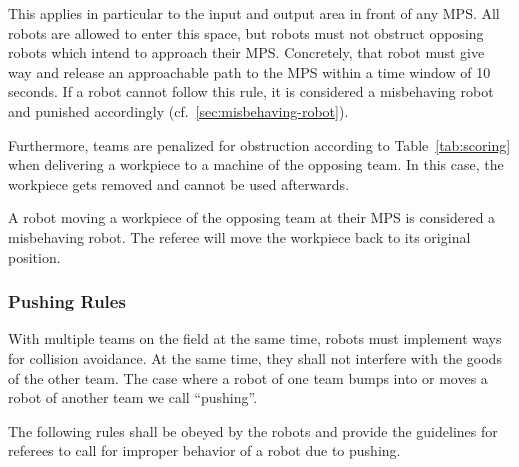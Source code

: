 \documentclass[12pt,twoside]{article}
\newcommand{\reftab}[1]{Table~\ref{#1}}
\begin{document}
This applies in particular to the input and output area in front of
any MPS\@.  All robots are allowed to enter this space, but robots must
not obstruct opposing robots which intend to approach their
MPS\@. Concretely, that robot must give way and release an approachable
path to the MPS within a time window of 10 seconds. If a robot cannot
follow this rule, it is considered a misbehaving robot and punished accordingly
(cf.~\ref{sec:misbehaving-robot}).

Furthermore, teams are penalized for obstruction according to
\reftab{tab:scoring} when delivering a workpiece to a machine of the
opposing team. In this case, the workpiece gets removed and cannot be
used afterwards.

A robot moving a workpiece of the opposing team at their MPS is considered a
misbehaving robot.
The referee will move the workpiece back to its original position.

\subsubsection{Pushing Rules}
\label{sec:pushing-rules}

With multiple teams on the field at the same time, robots must
implement ways for collision avoidance. At the same time, they shall
not interfere with the goods of the other team. The case where a robot
of one team bumps into or moves a robot of another team we
call ``pushing''.

The following rules shall be obeyed by the robots and provide the
guidelines for referees to call for improper behavior of a robot due
to pushing.
\end{document}

